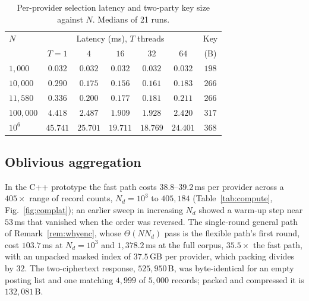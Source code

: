\documentclass[11pt,a4paper]{article}
\newlength{\tblwidth}\setlength{\tblwidth}{\linewidth}
\newcommand{\authorcheck}[1]{}
\begin{document}
\begin{table}[htbp]
\caption{Per-provider selection latency and two-party key size against $N$.
Medians of 21 runs.}
\label{tab:search}
\centering
\footnotesize
\setlength{\tabcolsep}{2pt}
\renewcommand{\arraystretch}{1.2}
\begin{tabular*}{\tblwidth}{@{\extracolsep{\fill}}lcccccc@{}}
\toprule
$N$ & \multicolumn{5}{c}{Latency (ms), $T$ threads} & Key \\
\cmidrule(lr){2-6}
    & $T=1$ & $4$ & $16$ & $32$ & $64$ & (B) \\
\midrule
$1{,}000$    & $0.032$  & $0.032$  & $0.032$  & $0.032$  & $0.032$  & $198$ \\
$10{,}000$   & $0.290$  & $0.175$  & $0.156$  & $0.161$  & $0.183$  & $266$ \\
$11{,}580$   & $0.336$  & $0.200$  & $0.177$  & $0.181$  & $0.211$  & $266$ \\
$100{,}000$  & $4.418$  & $2.487$  & $1.909$  & $1.928$  & $2.420$  & $317$ \\
$10^{6}$     & $45.741$ & $25.701$ & $19.711$ & $18.769$ & $24.401$ & $368$ \\
\bottomrule
\end{tabular*}
\end{table}

\subsection{Oblivious aggregation}
\label{sec:aggresult}
In the C++ prototype the fast path costs $38.8$--$39.2$\,ms per provider across
a $405\times$ range of record counts, $N_d=10^3$ to $405{,}184$
(Table~\ref{tab:compute}, Fig.~\ref{fig:complat}); an earlier sweep in
increasing $N_d$ showed a warm-up step near $53$\,ms that vanished when the
order was reversed. The single-round general path of Remark~\ref{rem:whyenc},
whose $\Theta(NN_d)$ pass is the flexible path's first round, cost $103.7$\,ms
at $N_d=10^3$ and $1{,}378.2$\,ms at the full corpus, $35.5\times$ the fast
path, with an unpacked masked index of $37.5$\,GB per provider, which packing
divides by $32$. \authorcheck{Re-measure this column in C++ as flexible round
one plus round two, with the packed index.} The two-ciphertext response,
$525{,}950$\,B, was byte-identical for an empty posting list and one matching
$4{,}999$ of $5{,}000$ records; packed and compressed it is $132{,}081$\,B.
\end{document}
